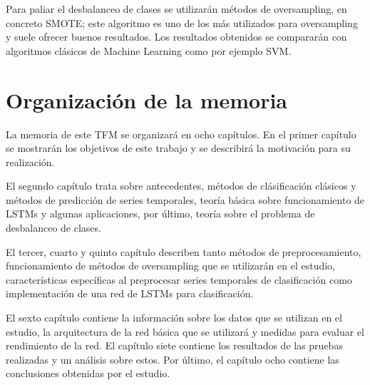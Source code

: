 Para paliar el desbalanceo de clases se utilizarán métodos de oversampling, en concreto SMOTE; este algoritmo es uno de los más utilizados para oversampling y suele ofrecer buenos resultados. Los resultados obtenidos se compararán con algoritmos clásicos de Machine Learning como por ejemplo SVM.
\newpage

\section{Organización de la memoria}
La memoria de este TFM se organizará en ocho capítulos. En el primer capítulo se mostrarán los objetivos de este trabajo y se describirá la motivación para su realización.\newline

El segundo capítulo trata sobre antecedentes, métodos de clásificación clásicos y métodos de predicción de series temporales, teoría básica sobre funcionamiento de LSTMs y algunas aplicaciones, por último, teoría sobre el problema de desbalanceo de clases.\newline

El tercer, cuarto y quinto capítulo describen tanto métodos de preprocesamiento, funcionamiento de métodos de oversampling que se utilizarán en el estudio, características específicas al preprocesar series temporales de clasificación  como implementación de una red de LSTMs para clasificación.\newline

El sexto capítulo contiene la información sobre los datos que se utilizan en el estudio, la arquitectura de la red básica que se utilizará y medidas para evaluar el rendimiento de la red. El capítulo siete contiene los resultados de las pruebas realizadas y un análisis sobre estos. Por último, el capítulo ocho contiene las conclusiones obtenidas por el estudio.